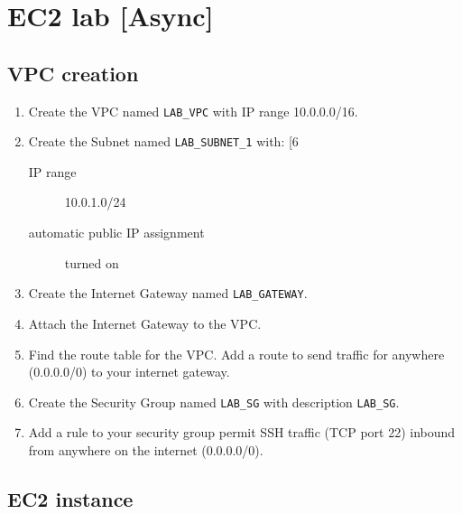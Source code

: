 \chapter{EC2 lab [Async]}
\label{ch:ec2-lab-async}

\section{VPC creation}

\begin{enumerate}

\item 
  Create the VPC named \texttt{LAB\_VPC} with IP range 10.0.0.0/16.

\item
  Create the Subnet named \texttt{LAB\_SUBNET\_1} with:
[6~  \begin{description}
  \item[IP range] 10.0.1.0/24
  \item[automatic public IP assignment] turned on
  \end{description}
  
\item
  Create the Internet Gateway named \texttt{LAB\_GATEWAY}.

\item
  Attach the Internet Gateway to the VPC.

\item
  Find the route table for the VPC.
  Add a route to send traffic for anywhere (0.0.0.0/0) to your internet gateway.

\item
  Create the Security Group named \texttt{LAB\_SG} with description \texttt{LAB\_SG}.

\item 
  Add a rule to your security group permit SSH traffic (TCP port 22) inbound from anywhere on the internet (0.0.0.0/0).
  
\end{enumerate}


\section{EC2 instance}

